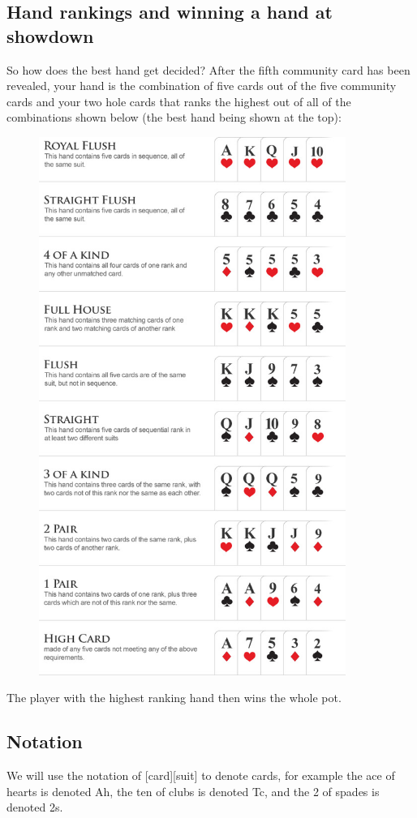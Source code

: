 \documentclass{article}
\begin{document}
\subsection{Hand rankings and winning a hand at showdown}
So how does the best hand get decided? After the fifth community card has been revealed, your hand is the combination of five cards out of the five community cards and your two hole cards that ranks the highest out of all of the combinations shown below (the best hand being shown at the top):
\begin{figure}[h]
    \centering
    \includegraphics[width=100mm]{images/how-to-ranking.jpg}
\end{figure}\newline 
The player with the highest ranking hand then wins the whole pot.
\subsection{Notation}
We will use the notation of [card][suit] to denote cards, for example the ace of hearts is denoted Ah, the ten of clubs is denoted Tc, and the 2 of spades is denoted 2s.
\end{document}
